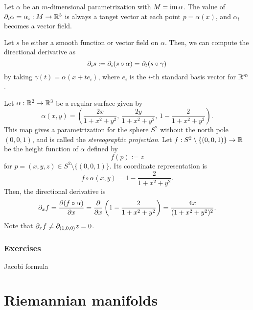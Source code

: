 \documentclass{../note}
\def\a{\alpha}
\begin{document}
\begin{ex} %
\begin{parts}
\item
Let $\a$ be an $m$-dimensional parametrization with $M=\im\a$.
The value of $\pd_i\a=\a_i:M\to\R^3$ is always a tanget vector at each point $p=\a(x)$, and $\a_i$ becomes a vector field.

Let $s$ be either a smooth function or vector field on $\a$.
Then, we can compute the directional derivative as
\[\pd_is:=\pd_i(s\circ\a)=\pd_t(s\circ\gamma)\]
by taking $\gamma(t)=\a(x+te_i)$, where $e_i$ is the $i$-th standard basis vector for $\mathbb{R}^m$.

\item
Let $\a:\R^2\to\R^3$ be a regular surface given by
\[\a(x,y)=\left(\frac{2x}{1+x^2+y^2},\,\frac{2y}{1+x^2+y^2},\,1-\frac2{1+x^2+y^2}\right).\]
This map gives a parametrization for the sphere $S^2$ without the north pole $(0,0,1)$, and is called the \emph{stereographic projection}.
Let $f:S^2\setminus\{(0,0,1)\}\to\mathbb{R}$ be the height function of $\a$ defined by
\[f(p):=z\]
for $p=(x,y,z)\in S^2\setminus\{(0,0,1)\}$.
Its coordinate representation is
\[f\circ\a(x,y)=1-\frac2{1+x^2+y^2}.\]
Then, the directional derivative is
\[\pd_xf=\pd{(f\circ\a)}{x}=\pd{x}\left(1-\frac2{1+x^2+y^2}\right)=\frac{4x}{(1+x^2+y^2)^2}.\]
Note that $\pd_xf\ne\pd_{(1,0,0)}z=0$.
\end{parts}
\end{ex}









\section*{Exercises}

\begin{prb}
\end{prb}
\begin{prb}
Jacobi formula
\end{prb}





\part{Riemannian manifolds}
\end{document}
